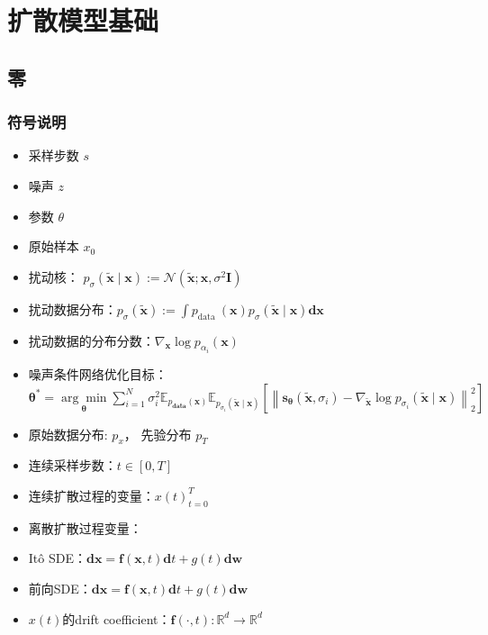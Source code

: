 \part{扩散模型基础}
\chapter{零}
\section{符号说明}
\begin{itemize}
    \item 采样步数 $s$
    \item 噪声 $z$
    \item 参数 $\theta$
    \item 原始样本 $x_0$
    \item  扰动核： $p_\sigma(\tilde{\mathbf{x}} \mid \mathbf{x}):=\mathcal{N}\left(\tilde{\mathbf{x}} ;\mathbf{x}, \sigma^2 \mathbf{I}\right)$
    \item 扰动数据分布：$p_\sigma(\tilde{\mathbf{x}}):=\int p_{\text {data }}(\mathbf{x})p_\sigma(\tilde{\mathbf{x}} \mid \mathbf{x}) \mathbf{d} \mathbf{x}$
    \item 扰动数据的分布分数：$\nabla_{\mathbf{x}} \log p_{\alpha_i}(\mathbf{x})$
    \item 噪声条件网络优化目标：$\boldsymbol{\theta}^*=\underset{\boldsymbol{\theta}}{\arg \min } \sum_{i=1}^N \sigma_i^2 \mathbb{E}_{p_{\mathbf{data}}(\mathbf{x})} \mathbb{E}_{p_{\sigma_i}(\tilde{\mathbf{x}} \mid \mathbf{x})}\left[\left\|\mathbf{s}_{\boldsymbol{\theta}}\left(\tilde{\mathbf{x}}, \sigma_i\right)-\nabla_{\tilde{\mathbf{x}}} \log p_{\sigma_i}(\tilde{\mathbf{x}} \mid \mathbf{x})\right\|_2^2\right]$
    \item  原始数据分布: $p_x$， 先验分布 $p_T$
    \item 连续采样步数：$t \in [0, T]$
    \item 连续扩散过程的变量：${x(t)}_{t=0}^{T}$
    \item 离散扩散过程变量：
    \item Itô SDE：$\mathbf{d} \mathbf{x}=\mathbf{f}(\mathbf{x}, t) \mathbf{d} t+g(t) \mathbf{d} \mathbf{w}$
    \item  前向SDE：$\mathbf{d} \mathbf{x}=\mathbf{f}(\mathbf{x}, t) \mathbf{d} t+g(t) \mathbf{d} \mathbf{w}$
    \item $x(t)$的drift coefficient：$\mathbf{f}(\cdot, t): \mathbb{R}^d \rightarrow \mathbb{R}^d$

\end{itemize}
